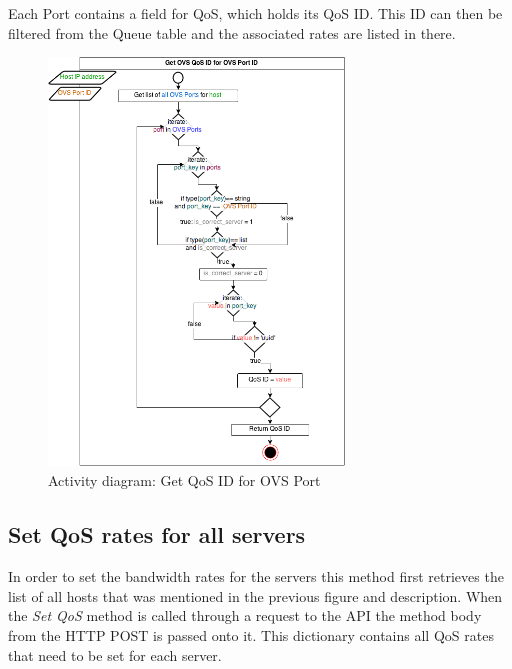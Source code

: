 Each Port contains a field for QoS, which holds its QoS ID. This ID can then be filtered from the Queue table and the associated rates are listed in there.

\begin{figure}[H]
\centering

\includegraphics[width=0.7\textwidth]{images/design/activity_get_qos_id_for_ovs_port}

\caption{Activity diagram: Get QoS ID for OVS Port}
\end{figure}

\subsection{Set QoS rates for all servers}

In order to set the bandwidth rates for the servers this method first retrieves the list of all hosts that was mentioned in the previous figure and description. When the \textit{Set QoS} method is called through a request to the API the method body from the HTTP POST is passed onto it. This dictionary contains all QoS rates that need to be set for each server. 


